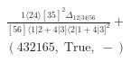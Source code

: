 \documentclass[varwidth, border=5pt]{standalone}
\begin{document}
\begin{my}
$\begin{gathered}
\scriptscriptstyle\frac{1⟨24⟩[35]^2Δ_{12|34|56}}{[56]⟨1|2+4|3]⟨2|1+4|3]^2}+\\
\scriptscriptstyle(432165,\;\text{True},\;-)\phantom{+}
\end{gathered}$
\end{my}
\end{document}

